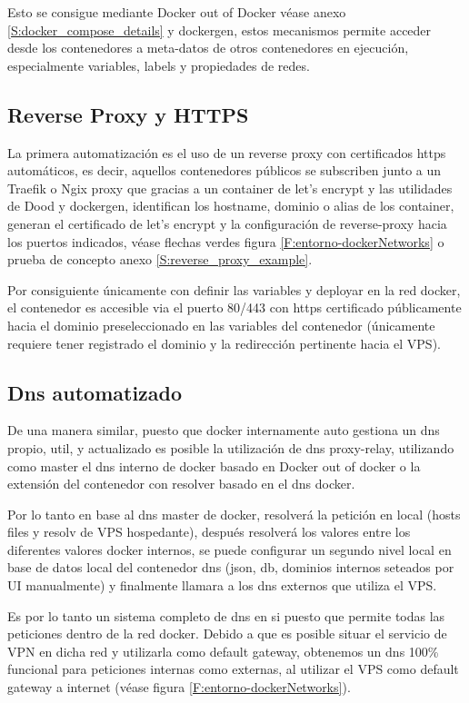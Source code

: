 Esto se consigue mediante Docker out of Docker\cite{c_dood} véase anexo \ref{S:docker_compose_details} y dockergen\cite{c_docker_gen}, estos mecanismos permite acceder desde los contenedores a meta-datos de otros contenedores en ejecución, especialmente variables, labels y propiedades de redes. 

\subsection{Reverse Proxy y HTTPS}
La primera automatización es el uso de un reverse proxy con certificados https automáticos, es decir, aquellos contenedores públicos se subscriben junto a un Traefik\cite{c_traefik} o Ngix\cite{c_ngix} proxy que gracias a un container de let's encrypt\cite{c_letsencrypt} y las utilidades de Dood\cite{c_dood} y dockergen\cite{c_docker_gen}, identifican los hostname, dominio o alias de los container, generan el certificado de let's encrypt y la configuración de reverse-proxy hacia los puertos indicados, véase flechas verdes figura \ref{F:entorno-dockerNetworks} o prueba de concepto anexo \ref{S:reverse_proxy_example}.

Por consiguiente únicamente con definir las variables y deployar en la red docker, el contenedor es accesible via el puerto 80/443 con https certificado públicamente hacia el dominio preseleccionado en las variables del contenedor (únicamente requiere tener registrado el dominio y la redirección pertinente hacia el VPS).

\subsection{Dns automatizado}
De una manera similar, puesto que docker internamente auto gestiona un dns propio, util, y actualizado es posible la utilización de dns proxy-relay, utilizando como master el dns interno de docker basado en Docker out of docker\cite{c_dood} o la extensión del contenedor con resolver basado en el dns docker.

Por lo tanto en base al dns master de docker, resolverá la petición en local (hosts files y resolv de VPS hospedante), después resolverá los valores entre los diferentes valores docker internos, se puede configurar un segundo nivel local en base de datos local del contenedor dns (json, db, dominios internos seteados por UI manualmente) y finalmente llamara a los dns externos que utiliza el VPS.

Es por lo tanto un sistema completo de dns en si puesto que permite todas las peticiones dentro de la red docker. Debido a que es posible situar el servicio de VPN en dicha red y utilizarla como default gateway, obtenemos un dns 100\% funcional para peticiones internas como externas, al utilizar el VPS como default gateway a internet (véase  figura \ref{F:entorno-dockerNetworks}).

